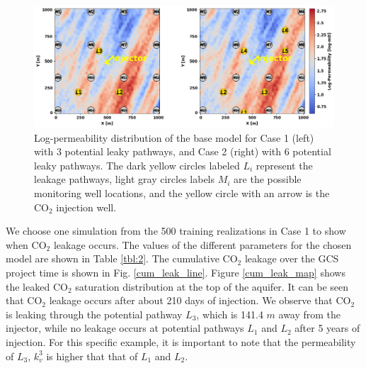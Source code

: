 \documentclass[10pt, twoside]{article}
\begin{document}
\begin{figure}[H]
\centering
\includegraphics[width=15 cm]{Figure 7.png}
\caption{Log-permeability distribution of the base model for Case 1 (left) with 3 potential leaky pathways, and Case 2 (right) with 6 potential leaky pathways. The dark yellow circles labeled $L_i$ represent the leakage pathways, light gray circles labels $M_i$ are the possible monitoring well locations, and the yellow circle with an arrow is the CO$_2$ injection well.}
\label{cases}
\end{figure}

We choose one simulation from the 500 training realizations in Case 1 to show when CO$_2$ leakage occurs. The values of the different parameters for the chosen model are shown in Table \ref{tbl:2}. The cumulative CO$_2$ leakage over the GCS project time is shown in Fig. \ref{cum_leak_line}. Figure \ref{cum_leak_map} shows the leaked CO$_2$ saturation distribution at the top of the aquifer. It can be seen that CO$_2$ leakage occurs after about 210 days of injection. We observe that CO$_2$ is leaking through the potential pathway $L_3$, which is 141.4 $m$ away from the injector, while no leakage occurs at potential pathways $L_1$ and $L_2$ after 5 years of injection. For this specific example, it is important to note that the permeability of $L_3$, $k_v^3$ is higher that that of $L_1$ and $L_2$.
\end{document}
